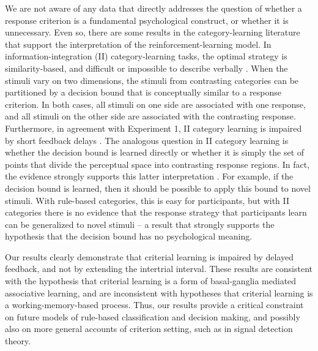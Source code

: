 \documentclass[doc, floatsintext]{apa7}
\begin{document}
We are not aware of any data that directly addresses the
question of whether a response criterion is a fundamental
psychological construct, or whether it is unnecessary. Even
so, there are some results in the category-learning
literature that support the interpretation of the
reinforcement-learning model. In information-integration
(II) category-learning tasks, the optimal strategy is
similarity-based, and difficult or impossible to describe
verbally \parencite[e.g.,][]{AshbyValentin2018}. When the
stimuli vary on two dimensions, the stimuli from contrasting
categories can be partitioned by a decision bound that is
conceptually similar to a response criterion. In both cases,
all stimuli on one side are associated with one response,
and all stimuli on the other side are associated with the
contrasting response. Furthermore, in agreement with
Experiment 1, II category learning is impaired by short
feedback delays \parencite{MaddoxAshbyBohil2003,
MaddoxIng2005}. The analogous question in II category
learning is whether the decision bound is learned directly
or whether it is simply the set of points that divide the
perceptual space into contrasting response regions.  In
fact, the evidence strongly supports this latter
interpretation \parencite{AshbyWaldron1999, CasaleEtAl2012}.
For example, if the decision bound is learned, then it
should be possible to apply this bound to novel stimuli.
With rule-based categories, this is easy for participants,
but with II categories there is no evidence that the
response strategy that participants learn can be generalized
to novel stimuli \parencite{CasaleEtAl2012} -- a result that
strongly supports the hypothesis that the decision bound has
no psychological meaning. 

Our results clearly demonstrate that criterial learning is
impaired by delayed feedback, and not by extending the
intertrial interval. These results are consistent with the
hypothesis that criterial learning is a form of
basal-ganglia mediated associative learning, and are
inconsistent with hypotheses that criterial learning is a
working-memory-based process. Thus, our results provide a
critical constraint on future models of rule-based
classification and decision making, and possibly also on
more general accounts of criterion setting, such as in
signal detection theory.
\end{document}
